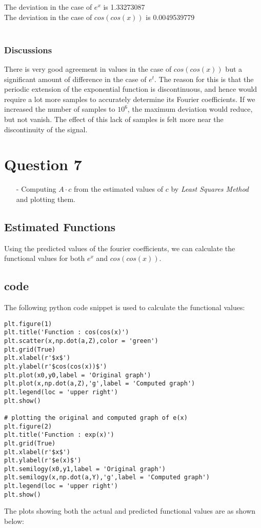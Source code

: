 \documentclass[11pt, a4paper, twoside]{article}
\begin{document}
The deviation in the case of $e^{x}$ is 1.33273087\\
The deviation in the case of $cos(cos(x))$ is 0.0049539779\\\\
 \subsubsection{Discussions}
There is very good agreement in values in the case of $cos(cos(x))$ but a significant amount of difference in the case of $e^{t}$. The reason for this is that the periodic extension of the exponential function is discontinuous, and hence would require a lot more samples to accurately determine its Fourier coefficients. If we increased the number of samples to $10^{6}$, the maximum deviation would reduce, but not vanish.
The effect of this lack of samples is felt more near the discontinuity of the signal.

\section{Question 7}
            \begin{itemize}
                \item[-] Computing $A\cdot c$ from the estimated values of $c$ by \textit{Least Squares Method} and plotting them.
            \end{itemize}

\subsection{Estimated Functions}
Using the predicted values of the fourier coefficients, we can calculate the functional values for both $e^{x}$ and $cos(cos(x))$.\\
\subsection{code}
The following python code snippet is used to calculate the functional values:
\begin{verbatim}	
plt.figure(1) 
plt.title('Function : cos(cos(x)')
plt.scatter(x,np.dot(a,Z),color = 'green')
plt.grid(True)
plt.xlabel(r'$x$')
plt.ylabel(r'$cos(cos(x))$')
plt.plot(x0,y0,label = 'Original graph')
plt.plot(x,np.dot(a,Z),'g',label = 'Computed graph')
plt.legend(loc = 'upper right')
plt.show()

# plotting the original and computed graph of e(x)
plt.figure(2)
plt.title('Function : exp(x)') 
plt.grid(True)
plt.xlabel(r'$x$')
plt.ylabel(r'$e(x)$')
plt.semilogy(x0,y1,label = 'Original graph')
plt.semilogy(x,np.dot(a,Y),'g',label = 'Computed graph')
plt.legend(loc = 'upper right')
plt.show()
\end{verbatim}
The plots showing both the actual and predicted functional values are as shown below:
\end{document}
